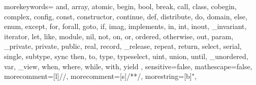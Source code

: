   {
    morekeywords={
      and, array, atomic,
      begin, bool, break,
      call, class, cobegin, complex, config, const, constructor, continue,
      def, distribute, do, domain,
      else, enum, except,
      for, forall,
      goto,
      if, imag, implements, in, int, inout, _invariant, iterator,
      let, like,
      module,
      nil, not,
      on, or, ordered, otherwise, out,
      param, _private, private, public,
      real, record, _release, repeat, return,
      select, serial, single, subtype, sync
      then, to, type, typeselect,
      uint, union, until, _unordered,
      var, _view,
      when, where, while, with,
      yield
    },
    sensitive=false,
    mathescape=false,
    morecomment=[l]{//},
    morecomment=[s]{/*}{*/},
    morestring=[b]",
}

\lstset{
    basicstyle=\footnotesize\tt,
    keywordstyle=\bf,
    commentstyle=\em,
    showstringspaces=false,
    flexiblecolumns=false,
    numbers=left,
    numbersep=5pt,
    numberstyle=\tiny,
    numberblanklines=false,
    stepnumber=0
  }

\newcommand{\chpl}[1]{\lstinline[language=chapel,basicstyle=\normalsize\tt,keywordstyle=]!#1!}


